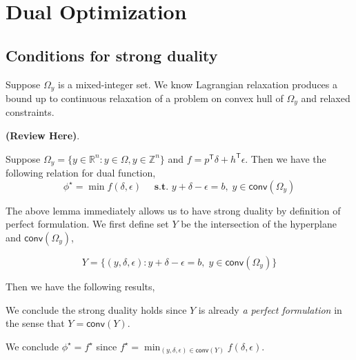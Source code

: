 \documentclass[../main]{subfiles}
\begin{document}
\section{Dual Optimization}\label{sec:dual}


\subsection{Conditions for strong
  duality}\label{sec:dual.conditions-for-strong-duality}




Suppose \(\Omega_y\) is a mixed-integer set. We know Lagrangian relaxation produces a bound up to
continuous relaxation of a problem on convex hull of \(\Omega_y\) and relaxed constraints.

\textbf{(Review Here)}.

\begin{lemma}\label{lemma.bound}
  Suppose \(\Omega_y = \{y \in \mathbb R^n: y \in \Omega, y\in \mathbb Z^n\}\) and
  \(f=p^\mathsf{T}\delta + h^\mathsf{T} \epsilon\).
  Then we have the following relation for dual function,
  \[ \phi^\star = \min f(\delta, \epsilon)\quad \textbf{ s.t. }  y + \delta - \epsilon = b,\; y \in \textsf{conv}(\Omega_y)\]
\end{lemma}

The above lemma immediately allows us to have strong duality by definition of perfect formulation. We first define set \(Y\) be the intersection of the hyperplane and \(\textsf{conv}(\Omega_y)\),

\begin{equation}
  Y = \{(y, \delta, \epsilon): y + \delta - \epsilon = b,\; y \in \textsf{conv}(\Omega_y)\}
\end{equation}

Then we have the following results,

\begin{corollary}\label{lemma.strong-ip}
  We conclude the strong duality holds since \(Y\) is already \emph{a perfect formulation} in the sense that
  \(Y = \textsf{conv}(Y)\).
\end{corollary}

We conclude \(\phi^\star = f^\star\) since
\(f^\star = \min_{(y, \delta, \epsilon) \in \textsf{conv}(Y)} f(\delta, \epsilon)\).
\end{document}
